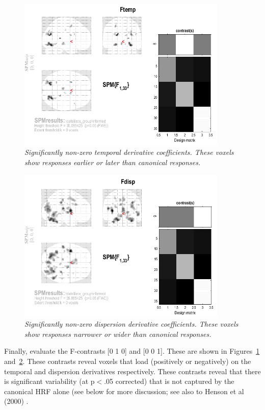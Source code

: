 \begin{figure}
\begin{center}
\includegraphics[width=100mm]{faces_group/Ftemp}
\caption{\em Significantly non-zero temporal derivative coefficients. These voxels show responses earlier or later than canonical responses. \label{informed_Ftemp}}
\end{center}
\end{figure}
\begin{figure}
\begin{center}
\includegraphics[width=100mm]{faces_group/Fdisp}
\caption{\em Significantly non-zero dispersion derivative coefficients. These voxels show responses narrower or wider than canonical responses. \label{informed_Fdisp}}
\end{center}
\end{figure}

Finally, evaluate the F-contrasts [0 1 0] and [0 0 1]. These are shown in Figures~\ref{informed_Ftemp} and~\ref{informed_Fdisp}.
These contrasts reveal voxels that load (positively or negatively) on the temporal and dispersion derivatives respectively. These contrasts reveal that there is significant variability (at p$<$.05 corrected) that is not captured by the canonical HRF alone (see below for more discussion; see also to Henson et al (2000) \cite{rnah_basis}.

